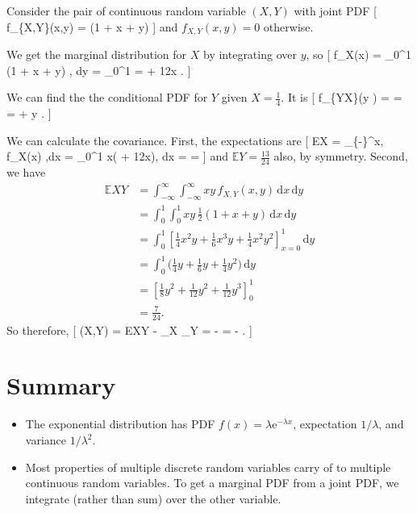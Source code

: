 \documentclass[
  letterpaper,
]{report}
\providecommand{\tightlist}{%
  \setlength{\itemsep}{0pt}\setlength{\parskip}{0pt}}\usepackage{longtable,booktabs,array}
\theoremstyle{definition}
\theoremstyle{definition}
\theoremstyle{remark}
\begin{document}
Consider the pair of continuous random variable \((X,Y)\) with joint PDF
{[} f\_\{X,Y\}(x,y) = (1 + x + y)
\qquad {} {]} and \(f_{X,Y}(x,y) = 0\)
otherwise.

We get the marginal distribution for \(X\) by integrating over \(y\), so
{[} f\_X(x) = \int\_0\^{}1 (1 + x + y) , \mathrm dy = 
\_0\^{}1 =  + \tfrac12x . {]}

We can find the the conditional PDF for \(Y\) given \(X = \tfrac14\). It
is {[} f\_\{Y\mid X\}\big(y \mid {}\big) =
 =
=  +  y . {]}

We can calculate the covariance. First, the expectations are {[}
\mathbb EX = \int\_\{-\infty\}\^{}\infty x, f\_X(x) ,\mathrm dx =
\int\_0\^{}1 x\big( + \tfrac12x\big), \mathrm dx =
 =  {]} and
\(\mathbb EY = \frac{13}{24}\) also, by symmetry. Second, we have
\begin{align*}
\mathbb EXY
&= \int_{-\infty}^\infty \int_{-\infty}^\infty xy\, f_{X,Y}(x,y) \, \mathrm dx\, \mathrm dy \\
&= \int_0^1 \int_0^1 xy \, \tfrac12(1 + x + y)\, \mathrm dx\, \mathrm dy \\
&= \int_0^1 \left[ \tfrac14 x^2y + \tfrac16 x^3y + \tfrac14 x^2y^2  \right]_{x=0}^1 \, \mathrm dy\\
&= \int_0^1 \big( \tfrac14 y + \tfrac16 y + \tfrac14 y^2 \big) \, \mathrm dy\\
&= \left[ \tfrac18 y^2 + \tfrac{1}{12}y^2 + \tfrac{1}{12}y^3  \right]_0^1 \\
&= \tfrac{7}{24} .
\end{align*} So therefore, {[} (X,Y) = \mathbb EXY -
\mu\_X \mu\_Y =  -  \times {} =
- . {]}

\hypertarget{summary-L17}{%
\section*{Summary}\label{summary-L17}}


\begin{itemize}
\tightlist
\item
  The exponential distribution has PDF
  \(f(x) = \lambda \mathrm e^{-\lambda x}\), expectation \(1/\lambda\),
  and variance \(1/\lambda^2\).
\item
  Most properties of multiple discrete random variables carry of to
  multiple continuous random variables. To get a marginal PDF from a
  joint PDF, we integrate (rather than sum) over the other variable.
\end{itemize}
\end{document}
